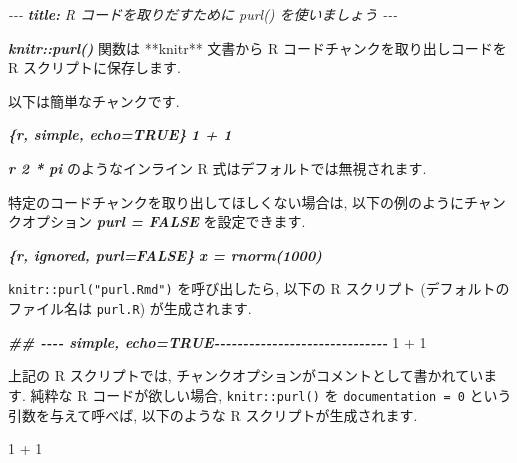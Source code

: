 \documentclass[
  11pt,
  lualatex,ja=standard,jafont=noto]{bxjsreport}
\newenvironment{Shaded}{\begin{snugshade}}{\end{snugshade}}
\newcommand{\AnnotationTok}[1]{\textcolor[rgb]{0.56,0.35,0.01}{\textbf{\textit{#1}}}}
\newcommand{\CommentTok}[1]{\textcolor[rgb]{0.56,0.35,0.01}{\textit{#1}}}
\newcommand{\DecValTok}[1]{\textcolor[rgb]{0.00,0.00,0.81}{#1}}
\newcommand{\DocumentationTok}[1]{\textcolor[rgb]{0.56,0.35,0.01}{\textbf{\textit{#1}}}}
\newcommand{\InformationTok}[1]{\textcolor[rgb]{0.56,0.35,0.01}{\textbf{\textit{#1}}}}
\newcommand{\NormalTok}[1]{#1}
\newcommand{\SpecialCharTok}[1]{\textcolor[rgb]{0.00,0.00,0.00}{#1}}
\begin{document}
\begin{Shaded}
\begin{Highlighting}[]
\CommentTok{{-}{-}{-}}
\AnnotationTok{title:}\CommentTok{ R コードを取りだすために \textasciigrave{}purl()\textasciigrave{} を使いましょう}
\CommentTok{{-}{-}{-}}

\InformationTok{\textasciigrave{}knitr::purl()\textasciigrave{}}\NormalTok{ 関数は **knitr** 文書から  R コードチャンクを取り出しコードを R スクリプトに保存します.}

\NormalTok{以下は簡単なチャンクです.}

\InformationTok{\textasciigrave{}\textasciigrave{}\textasciigrave{}\{r, simple, echo=TRUE\}}
\InformationTok{1 + 1}
\InformationTok{\textasciigrave{}\textasciigrave{}\textasciigrave{}}

\InformationTok{\textasciigrave{}r 2 * pi\textasciigrave{}}\NormalTok{ のようなインライン R 式はデフォルトでは無視されます.}

\NormalTok{特定のコードチャンクを取り出してほしくない場合は, 以下の例のようにチャンクオプション }\InformationTok{\textasciigrave{}purl = FALSE\textasciigrave{}}\NormalTok{ を設定できます. }

\InformationTok{\textasciigrave{}\textasciigrave{}\textasciigrave{}\{r, ignored, purl=FALSE\}}
\InformationTok{x = rnorm(1000)}
\InformationTok{\textasciigrave{}\textasciigrave{}\textasciigrave{}}
\end{Highlighting}
\end{Shaded}

\texttt{knitr::purl("purl.Rmd")} を呼び出したら, 以下の R スクリプト (デフォルトのファイル名は \texttt{purl.R}) が生成されます.

\begin{Shaded}
\begin{Highlighting}[]
\DocumentationTok{\#\# {-}{-}{-}{-} simple, echo=TRUE{-}{-}{-}{-}{-}{-}{-}{-}{-}{-}{-}{-}{-}{-}{-}{-}{-}{-}{-}{-}{-}{-}{-}{-}{-}{-}{-}{-}{-}{-}}
\DecValTok{1} \SpecialCharTok{+} \DecValTok{1}
\end{Highlighting}
\end{Shaded}

上記の R スクリプトでは, チャンクオプションがコメントとして書かれています. 純粋な R コードが欲しい場合, \texttt{knitr::purl()} を \texttt{documentation = 0} という引数を与えて呼べば, 以下のような R スクリプトが生成されます.

\begin{Shaded}
\begin{Highlighting}[]
\DecValTok{1} \SpecialCharTok{+} \DecValTok{1}
\end{Highlighting}
\end{Shaded}
\end{document}
